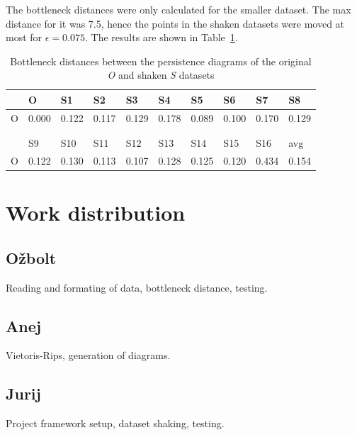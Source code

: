 \documentclass[11pt]{article}
\begin{document}
The bottleneck distances were only calculated for the smaller dataset. The max distance for it was 7.5, hence the points in the shaken datasets were moved at most for $\epsilon = 0.075$. The results are shown in Table~\ref{tab:bottle_dist}. 

\begin{table}[H]
	\begin{tabular}{llllllllll}
		& O & S1 & S2 & S3 & S4 & S5 & S6 & S7 & S8 \\
		\hline
		O & 0.000 & 0.122 & 0.117 & 0.129 & 0.178 & 0.089 & 0.100 & 0.170 & 0.129 \\
		\\
		\\
		& S9 & S10 & S11 & S12 & S13 & S14 & S15 & S16 & avg \\
		\hline
		O& 0.122 & 0.130 & 0.113 & 0.107 & 0.128 & 0.125 & 0.120 & 0.434 & 0.154\\
	\end{tabular}
	\caption{Bottleneck distances between the persistence diagrams of the original \emph{O} and shaken \emph{S} datasets}
	\label{tab:bottle_dist}
\end{table}


\section{Work distribution}

\subsection{Ožbolt}
Reading and formating of data, bottleneck distance, testing.

\subsection{Anej}
Vietoris-Rips, generation of diagrams.

\subsection{Jurij}
Project framework setup, dataset shaking, testing.

\newpage



\end{document}
